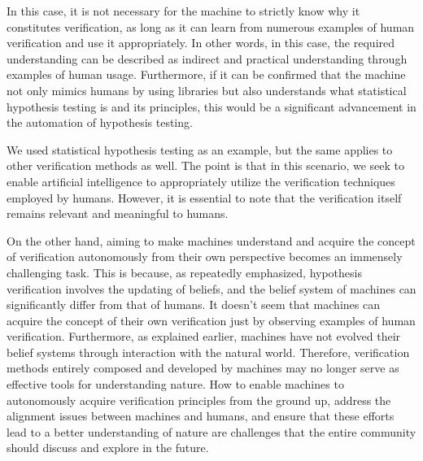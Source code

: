 \documentclass{book}
\begin{document}
In this case, it is not necessary for the machine to strictly know why it constitutes verification, as long as it can learn from numerous examples of human verification and use it appropriately. In other words, in this case, the required understanding can be described as indirect and practical understanding through examples of human usage. Furthermore, if it can be confirmed that the machine not only mimics humans by using libraries but also understands what statistical hypothesis testing is and its principles, this would be a significant advancement in the automation of hypothesis testing. 

We used statistical hypothesis testing as an example, but the same applies to other verification methods as well. The point is that in this scenario, we seek to enable artificial intelligence to appropriately utilize the verification techniques employed by humans. However, it is essential to note that the verification itself remains relevant and meaningful to humans.

On the other hand, aiming to make machines understand and acquire the concept of verification autonomously from their own perspective becomes an immensely challenging task. This is because, as repeatedly emphasized, hypothesis verification involves the updating of beliefs, and the belief system of machines can significantly differ from that of humans. It doesn't seem that machines can acquire the concept of their own verification just by observing examples of human verification. Furthermore, as explained earlier, machines have not evolved their belief systems through interaction with the natural world. Therefore, verification methods entirely composed and developed by machines may no longer serve as effective tools for understanding nature. How to enable machines to autonomously acquire verification principles from the ground up, address the alignment issues between machines and humans, and ensure that these efforts lead to a better understanding of nature are challenges that the entire community should discuss and explore in the future.

\end{document}
